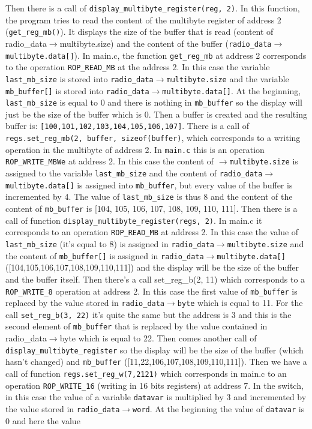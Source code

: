 \documentclass[11pt]{article}
\begin{document}
Then there is a call of \texttt{display\_multibyte\_register(reg, 2)}. In this function, the program tries to read the content of the multibyte register of address 2 (\texttt{get\_reg\_mb()}). It displays the size of the buffer that is read (content of radio\_data${\rightarrow}$multibyte.size) and the content of the buffer (\texttt{radio\_data${\rightarrow}$multibyte.data[]}). In main.c, the function \texttt{get\_reg\_mb} at address 2 corresponds to the operation \texttt{ROP\_READ\_MB} at the address 2. In this case the variable \texttt{last\_mb\_size} is stored into \texttt{radio\_data}${\rightarrow}$\texttt{multibyte.size} and the variable \texttt{mb\_buffer[]} is stored into \texttt{radio\_data}${\rightarrow}$\texttt{multibyte.data[]}. At the beginning, \texttt{last\_mb\_size} is equal to 0 and there is nothing in \texttt{mb\_buffer} so the display will just be the size of the buffer which is 0. Then a buffer is created and the resulting buffer is: \texttt{[100,101,102,103,104,105,106,107]}. There is a call of \texttt{regs.set\_reg\_mb(2, buffer, sizeof(buffer)}, which corresponds to a writing operation in the multibyte of address 2. In \texttt{main.c} this is an operation \texttt{ROP\_WRITE\_MBWe} at address 2. In this case the content of ${\rightarrow}$\texttt{multibyte.size} is assigned to the variable \texttt{last\_mb\_size} and the content of \texttt{radio\_data}${\rightarrow}$\texttt{multibyte.data[]} is assigned into \texttt{mb\_buffer}, but every value of the buffer is incremented by 4. The value of \texttt{last\_mb\_size} is thus 8 and the content of the content of \texttt{mb\_buffer} is [104, 105, 106, 107, 108, 109, 110, 111]. Then there is a call of function \texttt{display\_multibyte\_register(regs, 2)}. In main.c it corresponds to an operation \texttt{ROP\_READ\_MB} at address 2. In this case the value of \texttt{last\_mb\_size} (it's equal to 8) is assigned in \texttt{radio\_data}${\rightarrow}$\texttt{multibyte.size} and the content of \texttt{mb\_buffer[]} is assigned in \texttt{radio\_data}${\rightarrow}$\texttt{multibyte.data[]} ([104,105,106,107,108,109,110,111]) and the display will be the size of the buffer and the buffer itself. Then there's a call set\_reg\_b(2, 11) which corresponds to a \texttt{ROP\_WRITE\_8} operation at address 2. In this case the first value of \texttt{mb\_buffer} is replaced by the value stored in \texttt{radio\_data}${\rightarrow}$\texttt{byte} which is equal to 11. For the call \texttt{set\_reg\_b(3, 22)} it's quite the same but the address is 3 and this is the second element of \texttt{mb\_buffer} that is replaced by the value contained in radio\_data${\rightarrow}$byte which is equal to 22. Then comes another call of \texttt{display\_multibyte\_register} so the display will be the size of the buffer (which hasn't changed) and \texttt{mb\_buffer} ([11,22,106,107,108,109,110,111]). Then we have a call of function \texttt{regs.set\_reg\_w(7,2121)} which corresponds in main.c to an operation \texttt{ROP\_WRITE\_16} (writing in 16 bits registers) at address 7. In the switch, in this case the value of a variable \texttt{datavar} is multiplied by 3 and incremented by the value stored in \texttt{radio\_data}${\rightarrow}$\texttt{word}. At the beginning the value of \texttt{datavar} is 0 and here the value 
\end{document}
